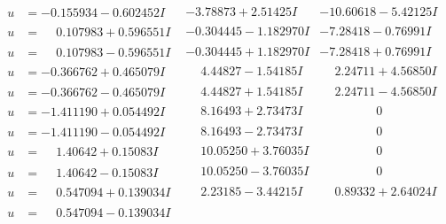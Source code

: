 \documentclass[1p]{elsarticle_modified}
\theoremstyle{definition}
\begin{document}
$$\begin{array}{c|c|c}
 \hline 
\begin{aligned}
u &= -0.155934 - 0.602452 I\end{aligned}
 & -3.78873 + 2.51425 I & -10.60618 - 5.42125 I \\ \hline\begin{aligned}
u &= \phantom{-}0.107983 + 0.596551 I\end{aligned}
 & -0.304445 - 1.182970 I & -7.28418 - 0.76991 I \\ \hline\begin{aligned}
u &= \phantom{-}0.107983 - 0.596551 I\end{aligned}
 & -0.304445 + 1.182970 I & -7.28418 + 0.76991 I \\ \hline\begin{aligned}
u &= -0.366762 + 0.465079 I\end{aligned}
 & \phantom{-}4.44827 - 1.54185 I & \phantom{-}2.24711 + 4.56850 I \\ \hline\begin{aligned}
u &= -0.366762 - 0.465079 I\end{aligned}
 & \phantom{-}4.44827 + 1.54185 I & \phantom{-}2.24711 - 4.56850 I \\ \hline\begin{aligned}
u &= -1.411190 + 0.054492 I\end{aligned}
 & \phantom{-}8.16493 + 2.73473 I & \phantom{-0.000000 } 0 \\ \hline\begin{aligned}
u &= -1.411190 - 0.054492 I\end{aligned}
 & \phantom{-}8.16493 - 2.73473 I & \phantom{-0.000000 } 0 \\ \hline\begin{aligned}
u &= \phantom{-}1.40642 + 0.15083 I\end{aligned}
 & \phantom{-}10.05250 + 3.76035 I & \phantom{-0.000000 } 0 \\ \hline\begin{aligned}
u &= \phantom{-}1.40642 - 0.15083 I\end{aligned}
 & \phantom{-}10.05250 - 3.76035 I & \phantom{-0.000000 } 0 \\ \hline\begin{aligned}
u &= \phantom{-}0.547094 + 0.139034 I\end{aligned}
 & \phantom{-}2.23185 - 3.44215 I & \phantom{-}0.89332 + 2.64024 I \\ \hline\begin{aligned}
u &= \phantom{-}0.547094 - 0.139034 I\end{aligned}

\end{array}$$
\end{document}
